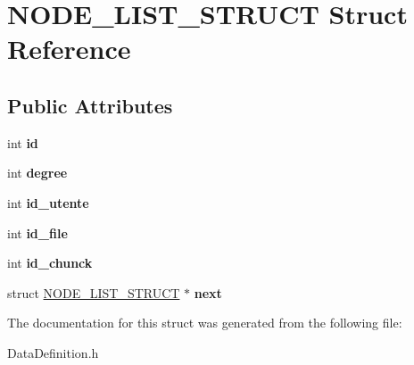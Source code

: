 \hypertarget{structNODE__LIST__STRUCT}{\section{N\-O\-D\-E\-\_\-\-L\-I\-S\-T\-\_\-\-S\-T\-R\-U\-C\-T Struct Reference}
\label{structNODE__LIST__STRUCT}
}
\subsection*{Public Attributes}
\begin{DoxyCompactItemize}
\item 
\hypertarget{structNODE__LIST__STRUCT_a34444a74455d1e7d59e13f1dae754321}{int {\bfseries id}}\label{structNODE__LIST__STRUCT_a34444a74455d1e7d59e13f1dae754321}

\item 
\hypertarget{structNODE__LIST__STRUCT_a63170b40e99791988837be24d177f65b}{int {\bfseries degree}}\label{structNODE__LIST__STRUCT_a63170b40e99791988837be24d177f65b}

\item 
\hypertarget{structNODE__LIST__STRUCT_a5887adfa6a4a3b94ba786593a12fa7ad}{int {\bfseries id\-\_\-utente}}\label{structNODE__LIST__STRUCT_a5887adfa6a4a3b94ba786593a12fa7ad}

\item 
\hypertarget{structNODE__LIST__STRUCT_abc43d88cc9b8427972095a4637969389}{int {\bfseries id\-\_\-file}}\label{structNODE__LIST__STRUCT_abc43d88cc9b8427972095a4637969389}

\item 
\hypertarget{structNODE__LIST__STRUCT_a19a415b69b3c7eb1ddeca6ce76670af9}{int {\bfseries id\-\_\-chunck}}\label{structNODE__LIST__STRUCT_a19a415b69b3c7eb1ddeca6ce76670af9}

\item 
\hypertarget{structNODE__LIST__STRUCT_a16cafa75205cd9acf5039b4502613f1a}{struct \hyperlink{structNODE__LIST__STRUCT}{N\-O\-D\-E\-\_\-\-L\-I\-S\-T\-\_\-\-S\-T\-R\-U\-C\-T} $\ast$ {\bfseries next}}\label{structNODE__LIST__STRUCT_a16cafa75205cd9acf5039b4502613f1a}

\end{DoxyCompactItemize}


The documentation for this struct was generated from the following file\-:\begin{DoxyCompactItemize}
\item 
Data\-Definition.\-h\end{DoxyCompactItemize}
